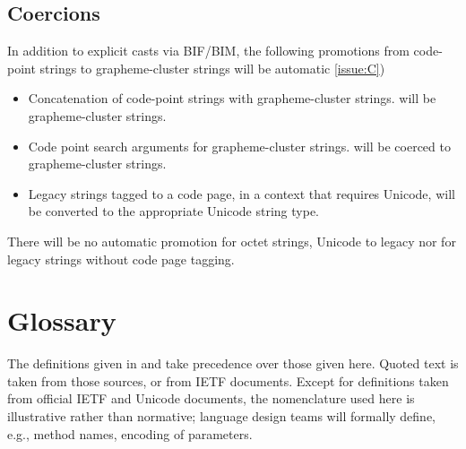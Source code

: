 \documentclass[b4paper]{article}
\begin{document}
\subsection{Coercions}
In addition to explicit casts via BIF/BIM, the following promotions
from code-point strings to grapheme-cluster strings will be automatic
\cref{issue:C})

\begin{itemize}
\item Concatenation of code-point strings with grapheme-cluster strings.
will be grapheme-cluster strings.
\item Code point search arguments for grapheme-cluster strings.
will be coerced to grapheme-cluster strings.
\item Legacy strings tagged to a code page, in a context that requires Unicode,
will be converted to the appropriate Unicode string type.
\end{itemize}

There will be no automatic promotion for octet strings, Unicode to
legacy nor for legacy strings without code page tagging.


\section{Glossary}


The definitions given in \cite{USTD:Gloss} and \cite{Unicode} take
precedence over those given here. Quoted text is taken from those sources, or from IETF documents.
Except for definitions taken from official IETF and Unicode documents,
the nomenclature used here is illustrative rather than normative;
language design teams will formally define, e.g., method names, encoding of parameters.
\end{document}
